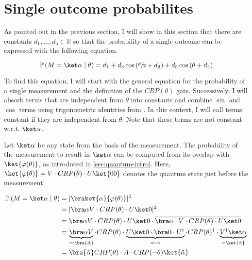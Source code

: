 \section{Single outcome probabilites}
\label{sec:single-outcome-probability}

As pointed out in the previous section, I will show in this section that there
are constants $d_1, \dots, d_5 \in \mathbb R$ so that the probability of a
single outcome can be expressed with the following equation.

\begin{equation}
    \mathbb P\left(M = \ket \alpha \mid \theta\right)
        = d_1 + d_3 \cos\left(\sfrac\theta2 + d_2\right) + d_5 \cos\left(\theta + d_4\right)
\end{equation}

To find this equation, I will start with the general equation for the
probability of a single measurement and the definition of the $CRP(\theta)$
gate. 
Successively, I will absorb terms that are independent from $\theta$ into
constants and combine $\sin$ and $\cos$ terms using trigonometric identities
from \cite{bronstejn_taschenbuch_2016}.
In this context, I will call terms constant if they are independent from
$\theta$.
Note that these terms are not constant w.r.t. $\ket\alpha$.

Let $\ket\alpha$ be any state from the basis of the measurement.
The probability of the measurement to result in $\ket\alpha$ can be computed
from its overlap with $\ket{\varphi(\theta)}$, as introduced in
\autoref{sec:quantum-intro}.
Here, $\ket{\varphi(\theta)} = V \cdot CRP(\theta) \cdot U\ket{00}$ denotes the
quantum state just before the measurement.

\begin{equation}
    \label{eq:single-outcome-prob}
    \begin{split}
        \mathbb P\left(M = \ket\alpha \mid \theta\right)
            &= \lvert\braket{\alpha}{\varphi(\theta)}\rvert^2\\
            &= \lvert \bra\alpha V \cdot CRP(\theta) \cdot U \ket0 \rvert^2 \\
            &= \bra\alpha V \cdot CRP(\theta) \cdot U \ket0
                \cdot \overline{\bra\alpha \cdot V \cdot CRP(\theta) \cdot U \ket0} \\
            &= \underbrace{\bra\alpha V}_{=: \bra{\tilde\alpha}} \cdot CRP(\theta)
                \cdot \underbrace{U \ket0 \cdot \bra0 \cdot U^\dagger}_{=: A} \cdot CRP(\theta)^\dagger
                \cdot \underbrace{V^\dagger \ket\alpha}_{=\ket{\tilde\alpha}} \\
            &= \bra{\tilde\alpha} CRP(\theta) \cdot A \cdot CRP(-\theta) \ket{\tilde\alpha}
    \end{split}
\end{equation}

